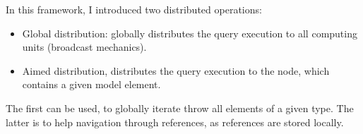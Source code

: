 In this framework, I introduced two distributed operations:
\begin{itemize}
	\item Global distribution: globally distributes the query execution to all computing units (broadcast mechanics).
	\item Aimed distribution, distributes the query execution to the node, which contains a given model element.
\end{itemize}

The first can be used, to globally iterate throw all elements of a given type. The latter is to help navigation through references, as references are stored locally.





